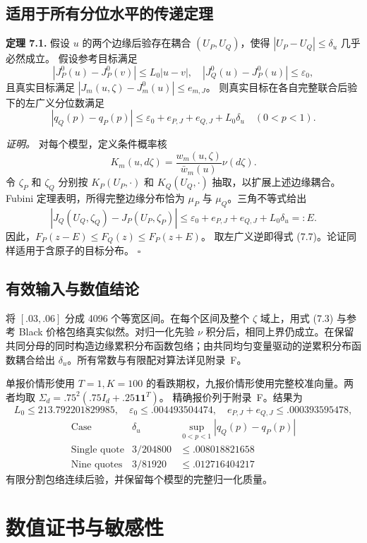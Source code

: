 \subsection{适用于所有分位水平的传递定理}

\textbf{定理 7.1.}
假设 \(u\) 的两个边缘后验存在耦合 \((U_P,U_Q)\)，使得 \(|U_P-U_Q|\le\delta_u\) 几乎必然成立。
假设参考目标满足
\[
|J_P^0(u)-J_P^0(v)|\le L_0|u-v|,
\quad
|J_Q^0(u)-J_P^0(u)|\le\varepsilon_0,
\]
且真实目标满足
\(|J_m(u,\zeta)-J_m^0(u)|\le e_{m,J}\)。
则真实目标在各自完整联合后验下的左广义分位数满足
\[
\boxed{\quad
|q_Q(p)-q_P(p)|
\le \varepsilon_0+e_{P,J}+e_{Q,J}+L_0\delta_u
\quad(0<p<1).\quad}
\tag{7.7}
\]

\textit{证明。}
对每个模型，定义条件概率核
\[
K_m(u,d\zeta)=\frac{w_m(u,\zeta)}{\bar w_m(u)}\nu(d\zeta).
\]
令 \(\zeta_P\) 和 \(\zeta_Q\) 分别按 \(K_P(U_P,\cdot)\) 和 \(K_Q(U_Q,\cdot)\) 抽取，以扩展上述边缘耦合。
Fubini 定理表明，所得完整边缘分布恰为 \(\mu_P\) 与 \(\mu_Q\)。三角不等式给出
\[
|J_Q(U_Q,\zeta_Q)-J_P(U_P,\zeta_P)|
\le\varepsilon_0+e_{P,J}+e_{Q,J}+L_0\delta_u=:E.
\]
因此，\(F_P(z-E)\le F_Q(z)\le F_P(z+E)\)。
取左广义逆即得式 (7.7)。论证同样适用于含原子的目标分布。
\hfill\(\square\)

\subsection{有效输入与数值结论}

将 \([.03,.06]\) 分成 4096 个等宽区间。在每个区间及整个 \(\zeta\) 域上，用式 (7.3) 与参考 Black 价格包络真实似然。对归一化先验 \(\nu\) 积分后，相同上界仍成立。在保留共同分母的同时构造边缘累积分布函数包络；由共同均匀变量驱动的逆累积分布函数耦合给出 \(\delta_u\)。所有常数与有限配对算法详见附录~F。

单报价情形使用 \(T=1,K=100\) 的看跌期权，九报价情形使用完整校准向量。两者均取
\(\Sigma_d=.75^2(.75I_d+.25\mathbf1\mathbf1^T)\)。
精确报价列于附录~F。结果为
\[
L_0\le213.792201829985,\quad
\varepsilon_0\le.004493504474,\quad
e_{P,J}+e_{Q,J}\le.000393595478,
\]
\[
\begin{array}{c|c|c}
\text{Case}&\delta_u&\sup_{0<p<1}|q_Q(p)-q_P(p)|\\ \hline
\text{Single quote}&3/204800&\le.008018821658\\
\text{Nine quotes}&3/81920&\le.012716404217
\end{array}
\tag{7.8}
\]
有限分割包络连续后验，并保留每个模型的完整归一化质量。
\section{数值证书与敏感性}

